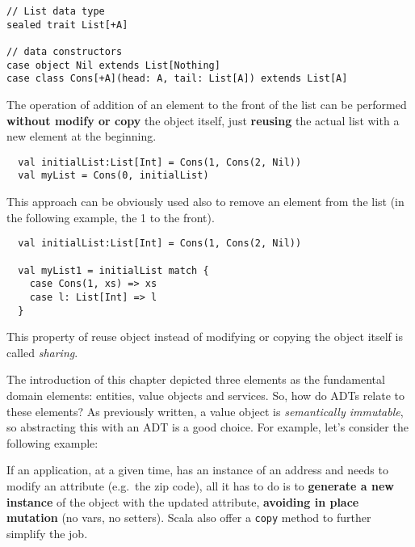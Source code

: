 \begin{verbatim}
// List data type
sealed trait List[+A]

// data constructors
case object Nil extends List[Nothing]
case class Cons[+A](head: A, tail: List[A]) extends List[A]
\end{verbatim}

The operation of addition of an element to the front of the list can be
performed \textbf{without modify or copy} the object itself, just
\textbf{reusing} the actual list with a new element at the beginning.

\begin{verbatim}
  val initialList:List[Int] = Cons(1, Cons(2, Nil))
  val myList = Cons(0, initialList)
\end{verbatim}

This approach can be obviously used also to remove an element from the
list (in the following example, the 1 to the front).

\begin{verbatim}
  val initialList:List[Int] = Cons(1, Cons(2, Nil))

  val myList1 = initialList match {
    case Cons(1, xs) => xs
    case l: List[Int] => l
  }
\end{verbatim}

This property of reuse object instead of modifying or copying the object
itself is called \emph{sharing}.

The introduction of this chapter depicted three elements as the
fundamental domain elements: entities, value objects and services. So,
how do ADTs relate to these elements? As previously written, a value
object is \emph{semantically immutable}, so abstracting this with an ADT
is a good choice. For example, let's consider the following example:

\begin{Shaded}
\begin{Highlighting}[]
  
\end{Highlighting}
\end{Shaded}

If an application, at a given time, has an instance of an address and
needs to modify an attribute (e.g.~the zip code), all it has to do is to
\textbf{generate a new instance} of the object with the updated
attribute, \textbf{avoiding in place mutation} (no vars, no setters).
Scala also offer a \texttt{copy} method to further simplify the job.

